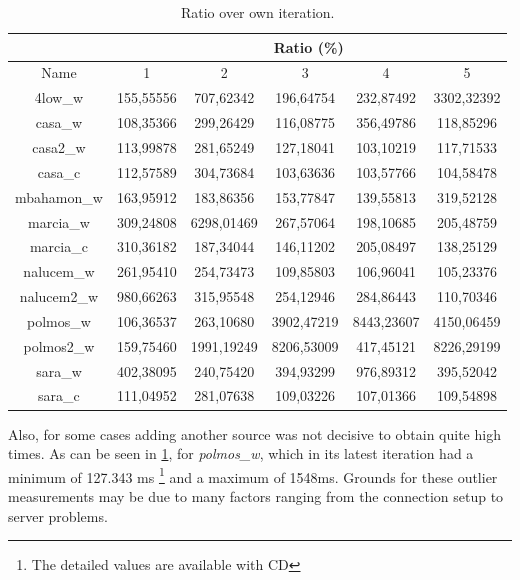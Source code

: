 \begin{table}[!ht]
\begin{center}
\begin{tabular}{|c||c|c|c|c|c||}
 \hline
 & \multicolumn{5}{|c|}{ Ratio (\%)} \\ \hline
Name 		& 1			& 2			 & 3	        & 4				& 5 			\\ \hline \hline
4low\_w		& 155,55556	& 707,62342	 & 196,64754	& 232,87492		& 3302,32392	\\ \hline
casa\_w		& 108,35366	& 299,26429	 & 116,08775	& 356,49786		& 118,85296 	\\ \hline
casa2\_w	& 113,99878	& 281,65249	 & 127,18041	& 103,10219		& 117,71533 	\\ \hline
casa\_c		& 112,57589	& 304,73684	 & 103,63636	& 103,57766		& 104,58478 	\\ \hline
mbahamon\_w	& 163,95912	& 183,86356	 & 153,77847	& 139,55813		& 319,52128 	\\ \hline
marcia\_w	& 309,24808	& 6298,01469 & 267,57064	& 198,10685		& 205,48759 	\\ \hline
marcia\_c	& 310,36182	& 187,34044	 & 146,11202	& 205,08497		& 138,25129 	\\ \hline
nalucem\_w	& 261,95410	& 254,73473	 & 109,85803	& 106,96041		& 105,23376 	\\ \hline
nalucem2\_w	& 980,66263	& 315,95548	 & 254,12946	& 284,86443		& 110,70346 	\\ \hline
polmos\_w	& 106,36537	& 263,10680	 & 3902,47219	& 8443,23607	& 4150,06459 	\\ \hline
polmos2\_w	& 159,75460	& 1991,19249 & 8206,53009	& 417,45121		& 8226,29199 	\\ \hline
sara\_w		& 402,38095	& 240,75420	 & 394,93299	& 976,89312		& 395,52042 	\\ \hline
sara\_c		& 111,04952	& 281,07638	 & 109,03226	& 107,01366		& 109,54898 	\\ \hline
\end{tabular}
\caption[Page Benchmark: Ratio over own iteration]{Ratio over own iteration.}
\label{table:variationratio}
\end{center}
\end{table}

Also, for some cases adding another source was not decisive to obtain quite high times. As can be seen in \ref{table:variationratio}, for
\emph{polmos\_w}, which in its latest iteration had a minimum of 127.343 ms
\footnote{The detailed values are available with CD} and a maximum of 1548ms.
Grounds for these outlier measurements may be due to many factors ranging
from the connection setup to server problems.
